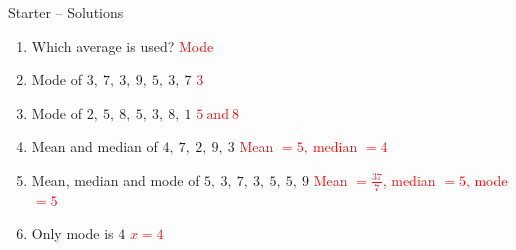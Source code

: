 \documentclass{beamer}
\begin{document}
\begin{frame}{Starter -- Solutions}
\vspace{-0.8em}

\footnotesize
\begin{enumerate}\itemsep2pt
  \item Which average is used?  
        \textcolor{red}{Mode}
  \item Mode of $3,\ 7,\ 3,\ 9,\ 5,\ 3,\ 7$  
        \textcolor{red}{$3$}
  \item Mode of $2,\ 5,\ 8,\ 5,\ 3,\ 8,\ 1$  
        \textcolor{red}{$5\ \text{and}\ 8$}
  \item Mean and median of $4,\ 7,\ 2,\ 9,\ 3$  
        \textcolor{red}{Mean $=5,\ \text{median }=4$}
  \item Mean, median and mode of $5,\ 3,\ 7,\ 3,\ 5,\ 5,\ 9$  
        \textcolor{red}{Mean $=\frac{37}{7}$, median $=5$, mode $=5$}
  \item Only mode is $4$  
        \textcolor{red}{$x=4$}
\end{enumerate}
\end{frame}
\end{document}
